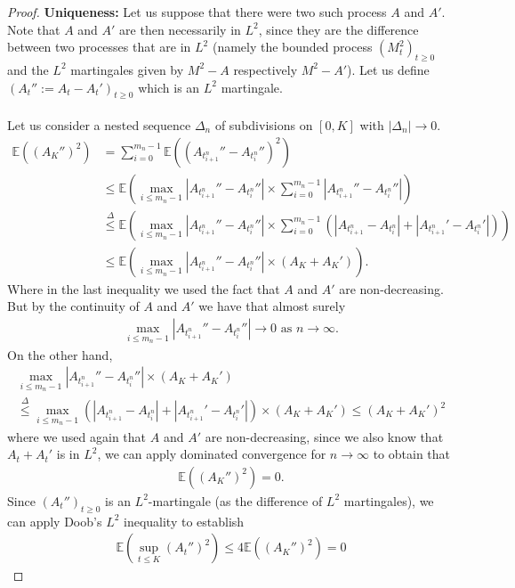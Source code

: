 \documentclass[../mainfile.tex]{subfiles}
\begin{document}
\begin{proof}
\textbf{Uniqueness:} Let us suppose that there were two such process $A$ and $A'$. Note that $A$ and $A'$ are then necessarily in $L^2$, since they are the difference between two processes that are in $L^2$ (namely the bounded process $(M_t^2)_{t \geq 0}$ and the $L^2$ martingales given by $M^2-A$ respectively $M^2-A'$). Let us define $(A_t'':= A_t-A_t')_{t \geq 0}$ which is an $L^2$ martingale.
\\\\
Let us consider a nested sequence $\Delta_n$ of subdivisions on $[0,K]$ with $|\Delta_n| \to 0$. 
\begin{align*}
\mathbb{E}((A_K'')^2) &= \sum_{i=0}^{m_n-1} \mathbb{E} ((A_{t_{i+1}^n}''-A_{t_i^n}'')^2) \\ & \leq \mathbb{E}( \max_{i \leq m_n-1} |A_{t_{i+1}^n}''-A_{t_i^n}''| \times \sum_{i=0}^{m_n-1} |A_{t_{i+1}^n}''-A_{t_i^n}''|) \\
& \overset{\Delta}\leq \mathbb{E}( \max_{i \leq m_n-1} |A_{t_{i+1}^n}''-A_{t_i^n}''| \times \sum_{i=0}^{m_n-1} ( | A_{t_{i+1}^n}-A_{t_i^n}| + |A_{t_{i+1}^n}'-A_{t_i^n}'|)) \\
& \leq \mathbb{E}( \max_{i \leq m_n-1} |A_{t_{i+1}^n}''-A_{t_i^n}''| \times (A_K+A_K')).
\end{align*}
Where in the last inequality we used the fact that $A$ and $A'$ are non-decreasing.
\newpage
But by the continuity of $A$ and $A'$ we have that almost surely
\begin{align*}
\max_{i \leq m_n-1} |A_{t_{i+1}^n}''-A_{t_i^n}''| \to 0 \text{ as } n \to \infty.
\end{align*}
On the other hand, 
\begin{align*}
\max_{i \leq m_n-1} |A_{t_{i+1}^n}''-A_{t_i^n}''| \times (A_K+A_K') \\ \overset{\Delta}\leq \max_{i \leq m_n-1}( | A_{t_{i+1}^n}-A_{t_i^n}| + |A_{t_{i+1}^n}'-A_{t_i^n}'|) \times (A_K+A_K') \leq (A_K + A_K')^2 
\end{align*}
where we used again that $A$ and $A'$ are non-decreasing, since we also know that $A_t+A_t'$ is in $L^2$, we can apply dominated convergence for $n \to \infty$ to obtain that 
\begin{align*}
\mathbb{E}((A_K'')^2) =0. 
\end{align*}
Since $(A_t'')_{t \geq 0}$ is an $L^2$-martingale (as the difference of $L^2$ martingales), we can apply Doob's $L^2$ inequality to establish 
\begin{align*}
\mathbb{E}( \sup_{t \leq K} (A_t'')^2) \leq 4 \mathbb{E}((A_K'')^2) =0

\end{align*}
\end{proof}
\end{document}
